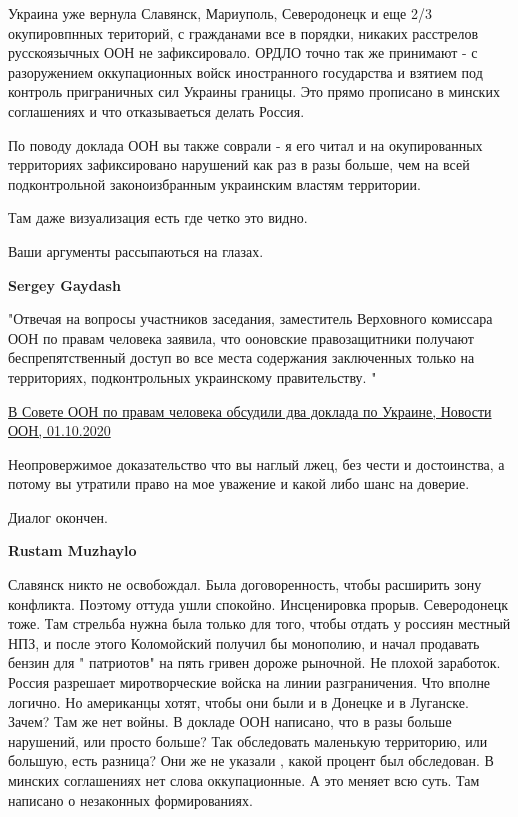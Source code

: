 \begin{itemize}
\begin{itemize}
Украина уже вернула Славянск, Мариуполь, Северодонецк и еще 2/3 окупировпнных
територий, с гражданами все в порядки, никаких расстрелов русскоязычных ООН не
зафиксировало. ОРДЛО точно так же принимают - с разоружением оккупационных
войск иностранного государства и взятием под контроль приграничных сил Украины
границы. Это прямо прописано в минских соглашениях и что отказываеться делать
Россия.

По поводу доклада ООН вы также соврали - я его читал и на окупированных
территориях зафиксировано нарушений как раз в разы больше, чем на всей
подконтрольной законоизбранным украинским властям территории.

Там даже визуализация есть где четко это видно.

Ваши аргументы рассыпаються на глазах.

 
\textbf{Sergey Gaydash}

"Отвечая на вопросы участников заседания, заместитель Верховного комиссара ООН
по правам человека заявила, что ооновские правозащитники получают
беспрепятственный доступ во все места содержания заключенных только на
территориях, подконтрольных украинскому правительству. "

\href{https://news.un.org/ru/story/2020/10/1387332}{%
В Совете ООН по правам человека обсудили два доклада по Украине, Новости ООН, 01.10.2020%
}

Неопровержимое доказательство что вы наглый лжец, без чести и достоинства, а
потому вы утратили право на мое уважение и какой либо шанс на доверие.

Диалог окончен.

 
\textbf{Rustam Muzhaylo} 

Славянск никто не освобождал. Была договоренность, чтобы расширить зону
конфликта. Поэтому оттуда ушли спокойно. Инсценировка прорыв. Северодонецк
тоже. Там стрельба нужна была только для того, чтобы отдать у россиян местный
НПЗ, и после этого Коломойский получил бы монополию, и начал продавать бензин
для " патриотов" на пять гривен дороже рыночной. Не плохой заработок. Россия
разрешает миротворческие войска на линии разграничения. Что вполне логично. Но
американцы хотят, чтобы они были и в Донецке и в Луганске. Зачем? Там же нет
войны. В докладе ООН написано, что в разы больше нарушений, или просто больше?
Так обследовать маленькую территорию, или большую, есть разница? Они же не
указали , какой процент был обследован. В минских соглашениях нет слова
оккупационные. А это меняет всю суть. Там написано о незаконных формированиях.


\end{itemize}
\end{itemize}
